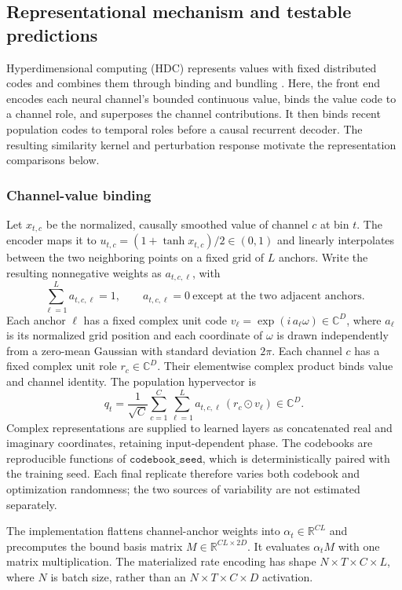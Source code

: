\subsection{Representational mechanism and testable predictions}
\label{sec:hdc-theory}

Hyperdimensional computing (HDC) represents values with fixed distributed
codes and combines them through binding and bundling
\citep{kanerva2009,kleyko2023survey}. Here, the front end encodes each neural
channel's bounded continuous value, binds the value code to a channel role,
and superposes the channel contributions. It then binds recent population
codes to temporal roles before a causal recurrent decoder. The resulting
similarity kernel and perturbation response motivate the representation
comparisons below.

\subsubsection{Channel-value binding}

Let $x_{t,c}$ be the normalized, causally smoothed value of channel $c$ at bin
$t$. The encoder maps it to $u_{t,c}=(1+\tanh x_{t,c})/2\in(0,1)$ and linearly
interpolates between the two neighboring points on a fixed grid of $L$ anchors.
Write the resulting nonnegative weights as $a_{t,c,\ell}$, with
\[
  \sum_{\ell=1}^{L} a_{t,c,\ell}=1,
  \qquad
  a_{t,c,\ell}=0\ \text{except at the two adjacent anchors.}
\]
Each anchor $\ell$ has a fixed complex unit code
$v_\ell=\exp(i\,a_\ell\omega)\in\mathbb{C}^D$, where $a_\ell$ is its
normalized grid position and each coordinate of $\omega$ is drawn
independently from a zero-mean Gaussian with standard deviation $2\pi$. Each
channel $c$ has a fixed complex unit role $r_c\in\mathbb{C}^D$. Their
elementwise complex product binds value and channel identity. The population
hypervector is
\[
  q_t=\frac{1}{\sqrt{C}}\sum_{c=1}^{C}\sum_{\ell=1}^{L}
       a_{t,c,\ell}\,(r_c\odot v_\ell)\in\mathbb{C}^{D}.
\]
Complex representations are supplied to learned layers as concatenated real
and imaginary coordinates, retaining input-dependent phase. The codebooks are reproducible functions of
$\texttt{codebook\_seed}$, which is deterministically paired with the training
seed. Each final replicate therefore varies both codebook and optimization
randomness; the two sources of variability are not estimated separately.

The implementation flattens channel-anchor weights into
$\alpha_t\in\mathbb{R}^{CL}$ and precomputes the bound basis matrix
$M\in\mathbb{R}^{CL\times 2D}$. It evaluates $\alpha_tM$ with one matrix
multiplication. The materialized rate encoding has shape
$N\times T\times C\times L$, where $N$ is batch size, rather than an
$N\times T\times C\times D$ activation.

